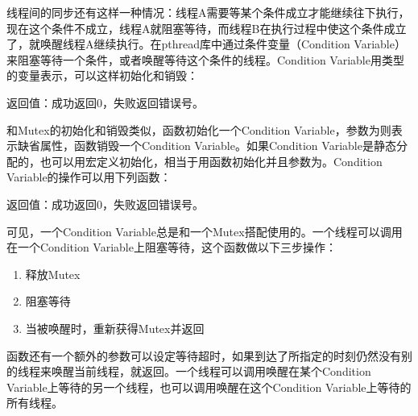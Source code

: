 线程间的同步还有这样一种情况：线程A需要等某个条件成立才能继续往下执行，现在这个条件不成立，线程A就阻塞等待，而线程B在执行过程中使这个条件成立了，就唤醒线程A继续执行。在pthread库中通过条件变量（Condition Variable）来阻塞等待一个条件，或者唤醒等待这个条件的线程。Condition Variable用类型的变量表示，可以这样初始化和销毁：




返回值：成功返回0，失败返回错误号。



和Mutex的初始化和销毁类似，函数初始化一个Condition Variable，参数为则表示缺省属性，函数销毁一个Condition Variable。如果Condition Variable是静态分配的，也可以用宏定义初始化，相当于用函数初始化并且参数为。Condition Variable的操作可以用下列函数：




返回值：成功返回0，失败返回错误号。



可见，一个Condition Variable总是和一个Mutex搭配使用的。一个线程可以调用在一个Condition Variable上阻塞等待，这个函数做以下三步操作：


\begin{enumerate}

\item 释放Mutex

\item 阻塞等待

\item 当被唤醒时，重新获得Mutex并返回
\end{enumerate}


函数还有一个额外的参数可以设定等待超时，如果到达了所指定的时刻仍然没有别的线程来唤醒当前线程，就返回。一个线程可以调用唤醒在某个Condition Variable上等待的另一个线程，也可以调用唤醒在这个Condition Variable上等待的所有线程。



